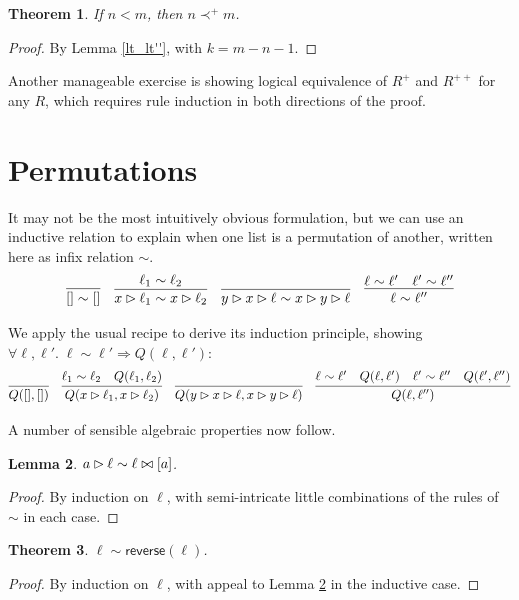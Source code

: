 \documentclass{amsbook}
\newtheorem{theorem}{Theorem}[chapter]
\newtheorem{lemma}[theorem]{Lemma}
\theoremstyle{definition}
\theoremstyle{remark}
\numberwithin{section}{chapter}
\numberwithin{equation}{chapter}
\begin{document}
\begin{theorem}
  If $n < m$, then $n \prec^+ m$.
\end{theorem}
\begin{proof}
  By Lemma \ref{lt_lt''}, with $k = m - n - 1$.
\end{proof}

Another manageable exercise is showing logical equivalence of $R^+$ and $R^{++}$ for any $R$, which requires rule induction in both directions of the proof.

\section{Permutations}

It may not be the most intuitively obvious formulation, but we can use an inductive relation to explain when one list is a permutation of another, written here as infix relation $\sim$.
$$\infer{[] \sim []}{}
\quad \infer{\push{x}{\ell_1} \sim \push{x}{\ell_2}}{
  \ell_1 \sim \ell_2
}
\quad \infer{\push{y}{\push{x}{\ell}} \sim \push{x}{\push{y}{\ell}}}{}
\quad \infer{\ell \sim \ell''}{
  \ell \sim \ell'
  & \ell' \sim \ell''
}$$

We apply the usual recipe to derive its induction principle, showing $\forall \ell, \ell'. \; \ell \sim \ell' \Rightarrow Q(\ell, \ell')$:
$$\infer{Q([], [])}{}
\quad \infer{Q(\push{x}{\ell_1}, \push{x}{\ell_2})}{
  \ell_1 \sim \ell_2
  & Q(\ell_1, \ell_2)
}
\quad \infer{Q(\push{y}{\push{x}{\ell}}, \push{x}{\push{y}{\ell}})}{}
\quad \infer{Q(\ell, \ell'')}{
  \ell \sim \ell'
  & Q(\ell, \ell')
  & \ell' \sim \ell''
  & Q(\ell', \ell'')
}$$

A number of sensible algebraic properties now follow.

\begin{lemma}\label{Permutation_to_front}
  $a \rhd \ell \sim \ell \bowtie [a]$.
\end{lemma}
\begin{proof}
  By induction on $\ell$, with semi-intricate little combinations of the rules of $\sim$ in each case.
\end{proof}

\begin{theorem}
  $\ell \sim \mathsf{reverse}(\ell)$.
\end{theorem}
\begin{proof}
  By induction on $\ell$, with appeal to Lemma \ref{Permutation_to_front} in the inductive case.
\end{proof}
\end{document}
